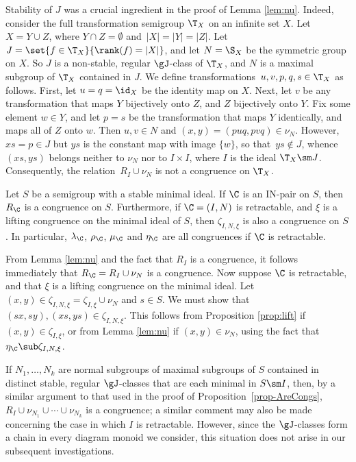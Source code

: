 \begin{rem}\label{rem:TX}
Stability of $J$ was a crucial ingredient in the proof of Lemma \ref{lem:nu}.  Indeed, consider the full transformation semigroup $\T_X$ on an infinite set $X$.  Let $X=Y\cup Z$, where $Y\cap Z=\emptyset$ and~${|X|=|Y|=|Z|}$.  Let~$J=\set{f\in\T_X}{\rank(f)=|X|}$, and let $N=\S_X$ be the symmetric group on $X$.  So $J$ is a non-stable, regular $\gJ$-class of $\T_X$, and $N$ is a maximal subgroup of $\T_X$ contained in $J$.  We define transformations~$u,v,p,q,s\in\T_X$ as follows.  First, let $u=q=\id_X$ be the identity map on $X$.  Next, let $v$ be any transformation that maps $Y$ bijectively onto $Z$, and $Z$ bijectively onto $Y$.  Fix some element $w\in Y$, and let $p=s$ be the transformation that maps $Y$ identically, and maps all of $Z$ onto $w$.  Then $u,v\in N$ and $(x,y)=(puq,pvq)\in\nu_N$.  However, $xs=p\in J$ but $ys$ is the constant map with image $\{w\}$, so that~$ys\not\in J$, whence $(xs,ys)$ belongs neither to $\nu_N$ nor to $I\times I$, where $I$ is the ideal $\T_X\sm J$.  Consequently, the relation~$R_I\cup\nu_N$ is not a congruence on $\T_X$.
\end{rem}

\begin{prop}
\label{prop-AreCongs}
Let $S$ be a semigroup with a stable minimal ideal.  If $\C$ is an IN-pair on $S$, then $R_\C$ is a congruence on $S$.  Furthermore, if $\C=(I,N)$ is retractable, and $\xi$ is a lifting congruence on the minimal ideal of $S$, then $\zeta_{I,N,\xi}$ is also a congruence on $S$.  In particular, $\lambda_\C$, $\rho_\C$, $\mu_\C$ and $\eta_\C$ are all congruences if $\C$ is retractable.
\end{prop}

\pf
From Lemma \ref{lem:nu} and the fact that $R_I$ is a congruence, it follows immediately that $R_\C=R_I\cup\nu_N$ is a congruence.  Now suppose $\C$ is retractable, and that $\xi$ is a lifting congruence on the minimal ideal.  Let $(x,y)\in\zeta_{I,N,\xi}=\zeta_{I,\xi}\cup\nu_N$ and $s\in S$.  We must show that $(sx,sy),(xs,ys)\in\zeta_{I,N,\xi}$.  This follows from Proposition \ref{prop:lift} if $(x,y)\in\zeta_{I,\xi}$, or from Lemma \ref{lem:nu} if $(x,y)\in\nu_N$, using the fact that~$\eta_\C\sub\zeta_{I,N,\xi}$.  \epf



\begin{rem}
If $N_1,\ldots,N_k$ are normal subgroups of maximal subgroups of $S$ contained in distinct stable, regular $\gJ$-classes that are each minimal in $S\sm I$, then, by a similar argument to that used in the proof of Proposition~\ref{prop-AreCongs}, $R_I\cup\nu_{N_1}\cup\cdots\cup\nu_{N_k}$ is a congruence; a similar comment may also be made concerning the case in which $I$ is retractable.  However, since the $\gJ$-classes form a chain in every diagram monoid we consider, this situation does not arise in our subsequent investigations.
\end{rem}

